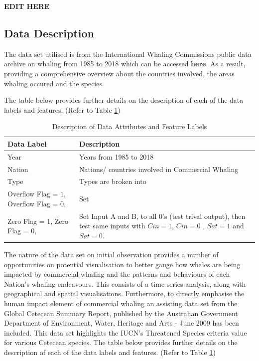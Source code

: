 \documentclass[12pt,a4paper]{article}
\begin{document}
\textbf{EDIT HERE}
\subsection{Data Description}
The data set utilised is from the International Whaling Commissions public data archive on whaling from 1985 to 2018 which can be accessed \textbf{here}. As a result, providing a comprehensive overview about the countries involved, the areas whaling occured and the species. 

The table below provides further details on the description of each of the data labels and features. (Refer to Table \ref{tab:table1}) 

\begin{table}[H]
\centering
\begin{tabular}{| m{5cm} |m{10cm}|}
\hline
 \textbf{Data Label} & \textbf{Description}\\ 
 \hline
    Year
  & 
  Years from 1985 to 2018
\\ 
 \hline
 Nation
  &   Nations/ countries involved in Commercial Whaling \\ 
 \hline
 Type
 & Types are broken into \\ 
 \hline
  Overflow Flag = $1$, 
  Overflow Flag = $0$, 
 & Set\\ 
 \hline
  Zero Flag = $1$, 
  Zero Flag = $0$, 
 & Set Input A and B, to all 0's (test trival output), then test same inputs with $Cin = 1$, $Cin = 0$ , $Sat = 1$ and $Sat = 0$.\\
   \hline
\end{tabular}
 \caption{\label{tab:table1} Description of Data Attributes and Feature Labels}
\end{table}

The nature of the data set on initial observation provides a number of opportunities on potential visualisation to better gauge how whales are being impacted by commercial whaling and the patterns and behaviours of each Nation's whaling endeavours. This consists of a time series analysis, along with geographical and spatial visualisations. Furthermore, to directly emphasise the human impact element of commercial whaling an assisting data set from the Global Cetecean Summary Report, published by the Australian Government Department of Environment,  Water, Heritage and Arts - June 2009 has been included. This data set highlights the IUCN's Threatened Species criteria value for various Cetecean species.  The table below provides further details on the description of each of the data labels and features. (Refer to Table \ref{tab:table1})
\end{document}
